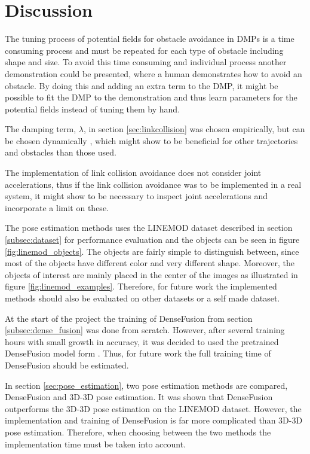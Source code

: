 \documentclass[../main.tex]{subfiles}
\begin{document}
\section{Discussion} \label{sec:discussion}

The tuning process of potential fields for obstacle avoidance in DMPs is a time consuming process and must be repeated for each type of obstacle including shape and size. To avoid this time consuming and individual process another demonstration could be presented, where a human demonstrates how to avoid an obstacle. By doing this and adding an extra term to the DMP, it might be possible to fit the DMP to the demonstration and thus learn parameters for the potential fields instead of tuning them by hand.

The damping term, $\lambda$, in section \ref{sec:linkcollision} was chosen empirically, but can be chosen dynamically \cite{buss_introduction_nodate}, which might show to be beneficial for other trajectories and obstacles than those used.

The implementation of link collision avoidance does not consider joint accelerations, thus if the link collision avoidance was to be implemented in a real system, it might show to be necessary to inspect joint accelerations and incorporate a limit on these.

The pose estimation methods uses the LINEMOD dataset described in section \ref{subsec:dataset} for performance evaluation and the objects can be seen in figure \ref{fig:linemod_objects}. The objects are fairly simple to distinguish between, since most of the objects have different color and very different shape. Moreover, the objects of interest are mainly placed in the center of the images as illustrated in figure \ref{fig:linemod_examples}. Therefore, for future work the implemented methods should also be evaluated on other datasets or a self made dataset.

At the start of the project the training of DenseFusion from section \ref{subsec:dense_fusion} was done from scratch. However, after several training hours with small growth in accuracy, it was decided to used the pretrained DenseFusion model form \cite{linemod_preprocessed}. Thus, for future work the full training time of DenseFusion should be estimated.

In section \ref{sec:pose_estimation}, two pose estimation methods are compared, DenseFusion and 3D-3D pose estimation. It was shown that DenseFusion outperforms the 3D-3D pose estimation on the LINEMOD dataset. However, the implementation and training of DenseFusion is far more complicated than 3D-3D pose estimation. Therefore, when choosing between the two methods the implementation time must be taken into account.
\end{document}
